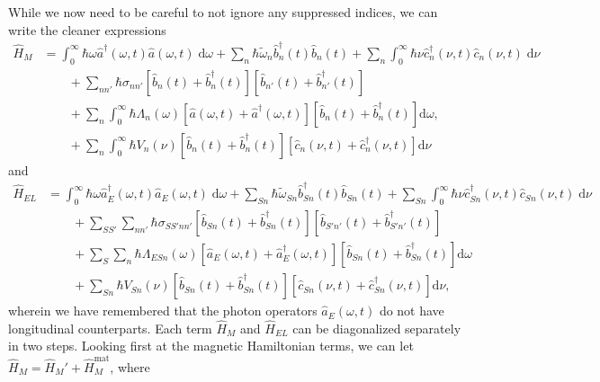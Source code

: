 \documentclass{article}
\begin{document}
While we now need to be careful to not ignore any suppressed indices, we can write the cleaner expressions
\begin{equation}
\begin{split}
\hat{H}_M &= \int_0^\infty\hbar\omega\hat{a}^\dagger(\omega,t)\hat{a}(\omega,t)\;\mathrm{d}\omega + \sum_n\hbar\tilde{\omega}_n\hat{b}_n^\dagger(t)\hat{b}_n(t) + \sum_n\int_0^\infty\hbar\nu\hat{c}_n^\dagger(\nu,t)\hat{c}_n(\nu,t)\;\mathrm{d}\nu\\
&\qquad + \sum_{nn'}\hbar\sigma_{nn'}\left[\hat{b}_n(t) + \hat{b}_n^\dagger(t)\right]\left[\hat{b}_{n'}(t) + \hat{b}_{n'}^\dagger(t)\right] \\
&\qquad + \sum_n\int_0^\infty\hbar\Lambda_n(\omega)\left[\hat{a}(\omega,t) + \hat{a}^\dagger(\omega,t)\right]\left[\hat{b}_n(t) + \hat{b}_n^\dagger(t)\right]\mathrm{d}\omega,\\
&\qquad + \sum_n\int_0^\infty\hbar V_n(\nu)\left[\hat{b}_n(t) + \hat{b}_n^\dagger(t)\right]\left[\hat{c}_n(\nu,t) + \hat{c}_n^\dagger(\nu,t)\right]\mathrm{d}\nu
\end{split}
\end{equation}
and
\begin{equation}
\begin{split}
\hat{H}_{EL} &= \int_0^\infty\hbar\omega\hat{a}_E^\dagger(\omega,t)\hat{a}_E(\omega,t)\;\mathrm{d}\omega + \sum_{Sn}\hbar\tilde{\omega}_{Sn}\hat{b}_{Sn}^\dagger(t)\hat{b}_{Sn}(t) + \sum_{Sn}\int_0^\infty\hbar\nu\hat{c}_{Sn}^\dagger(\nu,t)\hat{c}_{Sn}(\nu,t)\;\mathrm{d}\nu\\
&\qquad + \sum_{SS'}\sum_{nn'}\hbar\sigma_{SS'nn'}\left[\hat{b}_{Sn}(t) + \hat{b}_{Sn}^\dagger(t)\right]\left[\hat{b}_{S'n'}(t) + \hat{b}_{S'n'}^\dagger(t)\right]\\
&\qquad + \sum_{S}\sum_n\hbar\Lambda_{ESn}(\omega)\left[\hat{a}_{E}(\omega,t) + \hat{a}_{E}^\dagger(\omega,t)\right]\left[\hat{b}_{Sn}(t) + \hat{b}_{Sn}^\dagger(t)\right]\mathrm{d}\omega\\
&\qquad + \sum_{Sn}\hbar V_{Sn}(\nu)\left[\hat{b}_{Sn}(t) + \hat{b}_{Sn}^\dagger(t)\right]\left[\hat{c}_{Sn}(\nu,t) + \hat{c}_{Sn}^\dagger(\nu,t)\right]\mathrm{d}\nu,
\end{split}
\end{equation}
wherein we have remembered that the photon operators $\hat{a}_E(\omega,t)$ do not have longitudinal counterparts. Each term $\hat{H}_M$ and $\hat{H}_{EL}$ can be diagonalized separately in two steps. Looking first at the magnetic Hamiltonian terms, we can let $\hat{H}_M = \hat{H}_M' + \hat{H}_M^\mathrm{mat}$, where
\end{document}
